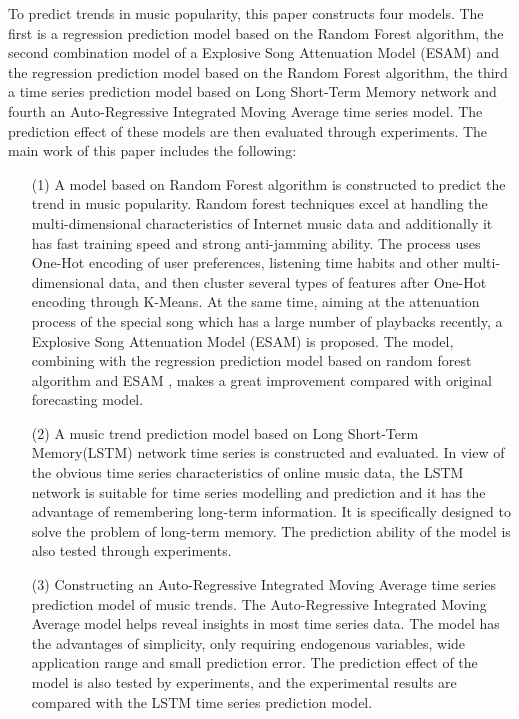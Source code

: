 \begin{eabstract}
   To predict trends in music popularity, this paper constructs four models. The first is a regression prediction model based on the Random Forest algorithm, the second combination model of a Explosive Song Attenuation Model (ESAM) and the regression prediction model based on the Random Forest algorithm, the third a time series prediction model based on Long Short-Term Memory network and fourth an Auto-Regressive Integrated Moving Average time series model. The prediction effect of these models are then evaluated through experiments. The main work of this paper includes the following:
   \begin{itemize}
     \item[(1)] {A model based on Random Forest algorithm is constructed to predict the trend in music popularity. Random forest techniques excel at handling the multi-dimensional characteristics of Internet music data and additionally it has fast training speed and strong anti-jamming ability. The process uses One-Hot encoding of user preferences, listening time habits and other multi-dimensional data, and then cluster several types of features after One-Hot encoding through K-Means. At the same time, aiming at the attenuation process of the special song which has a large number of playbacks recently, a Explosive Song Attenuation Model (ESAM) is proposed. The model, combining with the regression prediction model based on random forest algorithm and ESAM , makes a great improvement compared with original forecasting model.}
     \item[(2)] {A music trend prediction model based on Long Short-Term Memory(LSTM) network time series is constructed and evaluated. In view of the obvious time series characteristics of online music data, the LSTM network is suitable for time series modelling and prediction and it has the advantage of remembering long-term information. It is specifically designed to solve the problem of long-term memory. The prediction ability of the model is also tested through experiments.}
     \item[(3)] {Constructing an Auto-Regressive Integrated Moving Average time series prediction model of music trends. The Auto-Regressive Integrated Moving Average model helps reveal insights in most time series data. The model has the advantages of simplicity, only requiring endogenous variables, wide application range and small prediction error. The prediction effect of the model is also tested by experiments, and the experimental results are compared with the LSTM time series prediction model.}
    

\end{itemize}
\end{eabstract}
